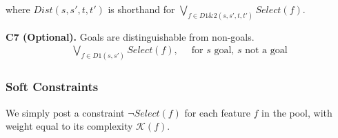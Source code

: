 \documentclass[a4paper]{article}
\newcommand{\smallpar}[1]{{\vspace{10pt}\noindent \bf #1.}}
\begin{document}
\noindent where $Dist(s, s', t, t')$ is shorthand for $\bigvee_{f \in D1\&2(s, s', t, t')} Select(f)$.


\smallpar{C7 (Optional)}
Goals are distinguishable from non-goals.
\begin{align}
\bigvee_{f \in D1(s, s')} Select(f),&\;\; \text{for $s$ goal, $s$ not a goal}
\end{align}



\subsubsection{Soft Constraints}
We simply post a constraint $\neg Select(f)$ for each feature $f$ in the pool, with weight equal to its complexity $\mathcal{K}(f)$.






\end{document}

